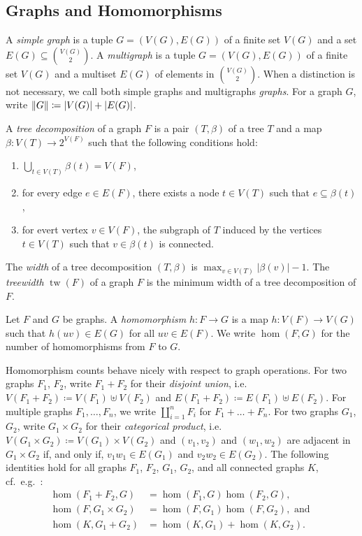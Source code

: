 \documentclass[11pt, DIV=15]{scrarticle}
\theoremstyle{definition}
\theoremstyle{plain}
\theoremstyle{remark}
\DeclarePairedDelimiter{\norm}{\lVert}{\rVert}
\DeclarePairedDelimiter{\abs}{\lvert}{\rvert}
\DeclareMathOperator{\tw}{tw}
\begin{document}
	\subsection{Graphs and Homomorphisms}

A \emph{simple graph} is a tuple $G = (V(G), E(G))$ of a finite set $V(G)$ and a set $E(G) \subseteq \binom{V(G)}{2}$.
A \emph{multigraph} is a tuple $G = (V(G), E(G))$ of a finite set $V(G)$ and a multiset $E(G)$ of elements in $\binom{V(G)}{2}$. 
When a distinction is not necessary, we call both simple graphs and multigraphs \emph{graphs}.
For a graph $G$, write $\norm{G} \coloneqq \abs{V(G)} + \abs{E(G)}$.

A \emph{tree decomposition} of a graph $F$ is a pair $(T, \beta)$ of a tree $T$ and a map $\beta \colon V(T) \to 2^{V(F)}$ such that the following conditions hold:
\begin{enumerate}
	\item $\bigcup_{t \in V(T)} \beta(t) = V(F)$,
	\item for every edge $e \in E(F)$, there exists a node $t \in V(T)$ such that $e \subseteq \beta(t)$,
	\item for evert vertex $v \in V(F)$, the subgraph of $T$ induced by the vertices $t \in V(T)$ such that $v\in \beta(t)$ is connected.
\end{enumerate}
The \emph{width} of a tree decomposition $(T, \beta)$ is $\max_{v \in V(T)} |\beta(v)| -1$. 
The \emph{treewidth} $\tw(F)$ of a graph $F$ is the minimum width of a tree decomposition of $F$.

Let $F$ and $G$ be graphs.
A \emph{homomorphism} $h \colon F\to G$ is a map $h \colon V(F) \to V(G)$ such that $h(uv) \in E(G)$ for all $uv \in E(F)$.
We write $\hom(F, G)$ for the number of homomorphisms from $F$ to $G$.

Homomorphism counts behave nicely with respect to graph operations.
For two graphs $F_1$, $F_2$, write $F_1 + F_2$ for their \emph{disjoint union}, i.e.\ $V(F_1 + F_2) \coloneqq V(F_1) \uplus V(F_2)$ and $E(F_1 + F_2) \coloneqq E(F_1) \uplus E(F_2)$.
For multiple graphs $F_1, \dots, F_n$, we write $\coprod_{i=1}^n F_i$ for $F_1 + \dots + F_n$.
For two graphs $G_1$, $G_2$, write $G_1 \times G_2$ for their \emph{categorical product}, i.e.\ $V(G_1 \times G_2) \coloneqq V(G_1) \times V(G_2)$ and $(v_1, v_2)$ and $(w_1, w_2)$ are adjacent in $G_1 \times G_2$ if, and only if, $v_1w_1 \in E(G_1)$ and $v_2w_2 \in E(G_2)$.
The following identities hold for all graphs $F_1$, $F_2$, $G_1$, $G_2$, and all connected graphs $K$, cf.\ e.g.\ \cite[(5.28)--(5.30)]{lovasz_large_2012}:
\begin{align}
	\hom(F_1 + F_2, G) &= \hom(F_1, G) \hom(F_2, G), \label{eq:coproduct} \\
	\hom(F, G_1 \times G_2) &= \hom(F, G_1) \hom(F, G_2), \text{ and }\label{eq:product} \\
	\hom(K, G_1 + G_2) &= \hom(K, G_1) + \hom(K, G_2). \label{eq:disjoint}
\end{align}
\end{document}

